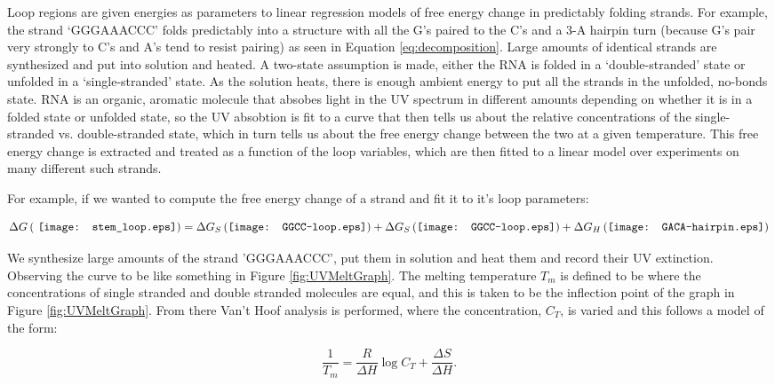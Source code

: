 Loop regions are given energies as parameters to linear regression
models of free energy change in predictably folding strands. For
example, the strand `GGGAAACCC' folds predictably into a structure
with all the G's paired to the C's and a 3-A hairpin turn (because G's
pair very strongly to C's and A's tend to resist pairing) as seen in
Equation \ref{eq:decomposition}. Large amounts of identical strands
are synthesized and put into solution and heated. A two-state
assumption is made, either the RNA is folded in a `double-stranded'
state or unfolded in a `single-stranded' state. As the solution heats,
there is enough ambient energy to put all the strands in the unfolded,
no-bonds state. RNA is an organic, aromatic molecule that absobes
light in the UV spectrum in different amounts depending on whether it
is in a folded state or unfolded state, so the UV absobtion is fit to
a curve that then tells us about the relative concentrations of the
single-stranded vs. double-stranded state, which in turn tells us
about the free energy change between the two at a given
temperature. This free energy change is extracted and treated as a
function of the loop variables, which are then fitted to a linear
model over experiments on many different such strands.

For example, if we wanted to compute the free energy change of a
strand and fit it to it's loop parameters:

\begin{equation}
\Delta G \left ( \vcenter{\hbox{ \texttt{[image: stem\_loop.eps]}}}
 \right ) =
\Delta G_S \left ( \vcenter{\hbox{\texttt{[image: GGCC-loop.eps]}}}
\right ) +
\Delta G_S \left ( \vcenter{\hbox{\texttt{[image: GGCC-loop.eps]}}}
\right ) + 
\Delta G_H \left (\vcenter{\hbox{\texttt{[image: GACA-hairpin.eps]}}}
\right ) 
\end{equation}

We synthesize large amounts of the strand 'GGGAAACCC', put them in
solution and heat them and record their UV extinction. Observing the
curve to be like something in Figure \ref{fig:UVMeltGraph}. The
melting temperature $T_m$ is defined to be where the concentrations of
single stranded and double stranded molecules are equal, and this is
taken to be the inflection point of the graph in Figure
\ref{fig:UVMeltGraph}. From there Van't Hoof analysis is performed,
where the concentration, $C_T$, is varied and this follows a model of
the form:

\begin{equation}
  \frac{1}{T_m} = \frac{R}{\Delta H} \log{C_T} + \frac{\Delta S}{\Delta H}.
\end{equation}

